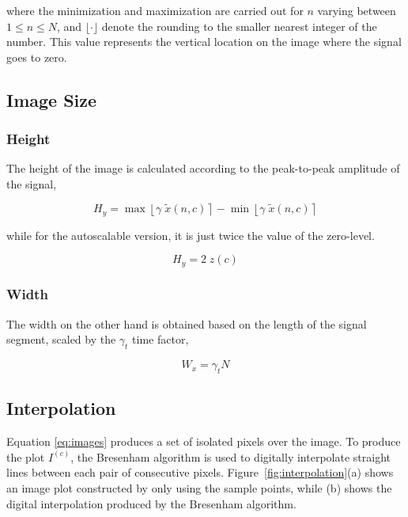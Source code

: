 \noindent where the minimization and maximization are carried out for $n$ varying between ${1 \leq n\leq N}$, and $ \lfloor \cdot  \rfloor $ denote the rounding to the smaller nearest integer of the number.  This value represents the vertical location on the image where the signal goes to zero.  

\subsection{Image Size}

\subsubsection{Height}

The height of the image is calculated according to the peak-to-peak amplitude of the signal,

\begin{equation}
H_y = \max \left\lfloor \gamma \; \tilde{x}(n,c) \right\rceil  - \min \left\lfloor \gamma \; \tilde{x}(n,c) \right\rceil 
\label{eq:height}
\end{equation}

\noindent while for the autoscalable version, it is just twice the value of the zero-level.

\begin{equation}
H_y = 2 \; z(c)
\label{eq:autoscaleheight}
\end{equation}


\subsubsection{Width}

The width on the other hand is obtained based on the length of the signal segment, scaled by the $\gamma_t$  time factor,

\begin{equation}
W_x = \gamma_t  N
\label{eq:width}
\end{equation}


\subsection{Interpolation}

Equation \ref{eq:images} produces a set of isolated pixels over the image.  To produce the plot $I^{(c)}$, the Bresenham \cite{Bresenham1965,Ramele2016} algorithm is used to digitally interpolate straight lines between each pair of consecutive pixels.  Figure~\ref{fig:interpolation}(a) shows an image plot constructed by only using the sample points, while (b) shows the digital interpolation produced by the Bresenham algorithm.

